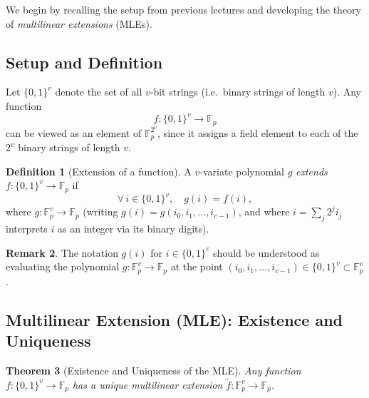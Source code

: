 \documentclass[11pt]{article}
\theoremstyle{plain}
\newtheorem{theorem}{Theorem}[section]
\theoremstyle{definition}
\newtheorem{definition}[theorem]{Definition}
\newtheorem{remark}[theorem]{Remark}
\begin{document}
We begin by recalling the setup from previous lectures and developing the theory of
\emph{multilinear extensions} (MLEs).

\subsection{Setup and Definition}

\begin{tcolorbox}[colback=blue!5!white, colframe=blue!50!black, title=Setup]
Let $\{0,1\}^v$ denote the set of all $v$-bit strings (i.e.\ binary strings of length $v$).
Any function
\[
  f : \{0,1\}^v \to \mathbb{F}_p
\]
can be viewed as an element of $\mathbb{F}_p^{2^v}$, since it assigns a field element to
each of the $2^v$ binary strings of length $v$.
\end{tcolorbox}

\begin{definition}[Extension of a function]
A $v$-variate polynomial $g$ \emph{extends} $f : \{0,1\}^v \to \mathbb{F}_p$ if
\[
  \forall\, i \in \{0,1\}^v, \quad g(i) = f(i),
\]
where $g : \mathbb{F}_p^v \to \mathbb{F}_p$ (writing $g(i) = g(i_0, i_1, \ldots, i_{v-1})$,
and where $i = \sum_j 2^j i_j$ interprets $i$ as an integer via its binary digits).
\end{definition}

\begin{remark}
The notation $g(i)$ for $i \in \{0,1\}^v$ should be understood as evaluating the polynomial
$g : \mathbb{F}_p^v \to \mathbb{F}_p$ at the point $(i_0, i_1, \ldots, i_{v-1}) \in \{0,1\}^v
\subset \mathbb{F}_p^v$.
\end{remark}

\subsection{Multilinear Extension (MLE): Existence and Uniqueness}

\begin{tcolorbox}[colback=green!5!white, colframe=green!50!black, title=Key Theorem (MLE)]
\begin{theorem}[Existence and Uniqueness of the MLE]
\label{thm:mle}
Any function $f : \{0,1\}^v \to \mathbb{F}_p$ has a \emph{unique} multilinear extension
$\widetilde{f} : \mathbb{F}_p^v \to \mathbb{F}_p$.
\end{theorem}
\end{tcolorbox}
\end{document}
